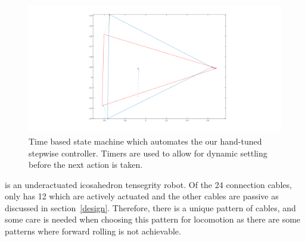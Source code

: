 \label{hand_stepwise}
\begin{figure}[thpb]
      \centering
      \includegraphics[width=1\columnwidth]{tex/img/Single_flop_bottom_triangle}
      \caption{Time based state machine which automates the our hand-tuned stepwise controller. Timers are used to allow for dynamic settling before the next action is taken.}
      \label{fig:single_flop}
\end{figure}

\SB{} is an underactuated icosahedron tensegrity robot.
Of the 24 connection cables, \SB{} only has 12 which are actively actuated and the other cables are passive as discussed in section~\ref{design}.
Therefore, there is a unique pattern of cables, and some care is needed when choosing this pattern for locomotion as there are some patterns where forward rolling is not achievable. 





